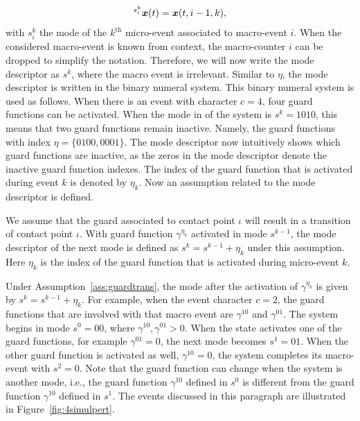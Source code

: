 \documentclass[../DC2017114Bouma.tex]{subfiles}
\begin{document}
\begin{align}
\hspace{0cm}^{s^k_i}{\boldsymbol{x}}(t) = {\boldsymbol{x}}(t,i-1,k),
\end{align}
with $s^k_i$ the mode of the $k^{\text{th}}$ micro-event associated to macro-event $i$. When the considered macro-event is known from context, the macro-counter $i$ can be dropped to simplify the notation. Therefore, we will now write the mode descriptor as $s^k$, where the macro event is irrelevant. Similar to $\eta$, the mode descriptor is written in the binary numeral system. This binary numeral system is used as follows. When there is an event with character $c = 4$, four guard functions can be activated. When the mode in of the system is $s^k = 1010$, this means that two guard functions remain inactive. Namely, the guard functions with index $\eta = \{0100,0001\}$. The mode descriptor now intuitively shows which guard functions are inactive, as the zeros in the mode descriptor denote the inactive guard function indexes. The index of the guard function that is activated during event $k$ is denoted by $\eta_k$. Now an assumption related to the mode descriptor is defined.

\begin{myass}\label{ass:guardtrans}
We assume that the guard associated to contact point $\iota$ will result in a transition of contact point $\iota$. With guard function $\gamma^{\eta_k}$ activated in mode $s^{k-1}$, the mode descriptor of the next mode is defined as $s^{k} = s^{k-1} + \eta_k$ under this assumption. Here $\eta_k$ is the index of the guard function that is activated during micro-event $k$.
\end{myass}

Under Assumption~\ref{ass:guardtrans}, the mode after the activation of $\gamma^{\eta_k}$ is given by $s^{k} = s^{k-1} + \eta_k$. For example, when the event character $c = 2$, the guard functions that are involved with that macro event are $\gamma^{10}$ and $\gamma^{01}$. The system begins in mode $s^0 = 00$, where $\gamma^{10},\gamma^{01}>0$. When the state activates one of the guard functions, for example $\gamma^{01}=0$, the next mode becomes $s^1 = 01$. When the other guard function is activated as well, $\gamma^{10} = 0$, the system completes its macro-event with $s^2 = 0$. Note that the guard function can change when the system is another mode, i.e., the guard function $\gamma^{10}$ defined in $s^0$ is different from the guard function $\gamma^{10}$ defined in $s^1$. The events discussed in this paragraph are illustrated in Figure~\ref{fig:4simulpert}.
\end{document}
